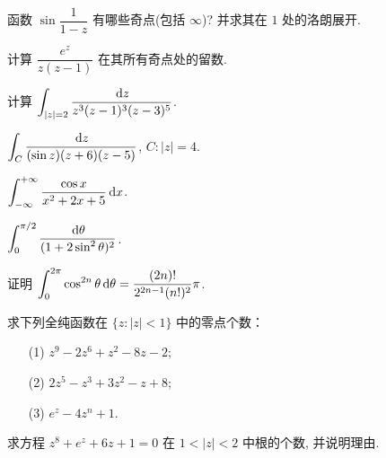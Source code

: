 \item 函数 $\sin\dfrac{1}{1-z}$ 有哪些奇点(包括 $\infty$)? 并求其在 $1$ 处的洛朗展开.
\item 计算 $\dfrac{e^z}{z(z-1)}$ 在其所有奇点处的留数.

\item 计算 $\displaystyle\int_{|z|=2}\frac{\,\mathrm{d} z}{z^3(z-1)^3(z-3)^5}$.

\item $\displaystyle\int_C\dfrac{\,\mathrm{d} z}{(\sin z)(z+6)(z-5)}$, $C:|z|=4$.
\item $\displaystyle\int_{-\infty}^{+\infty}\dfrac{\cos x}{x^2+2x+5}\,\mathrm{d} x$.
\item $\displaystyle\int_0^{\pi/2}\dfrac{\,\mathrm{d} \theta}{(1+2\sin^2\theta)^2}$.

\item 证明 $\displaystyle\int_0^{2\pi}\cos^{2n}\theta\,\mathrm{d} \theta=\dfrac{(2n)!}{2^{2n-1}(n!)^2}\pi$.

\item 求下列全纯函数在 $\{z:|z|<1\}$ 中的零点个数：
\begin{enumerate}
\item[(1)] $z^9-2z^6+z^2-8z-2$;
\item[(2)] $2z^5-z^3+3z^2-z+8$;
\item[(3)] $e^z-4z^n+1$.
\end{enumerate}


\item 求方程 $z^8+e^z+6z+1=0$ 在 $1<|z|<2$ 中根的个数, 并说明理由.



